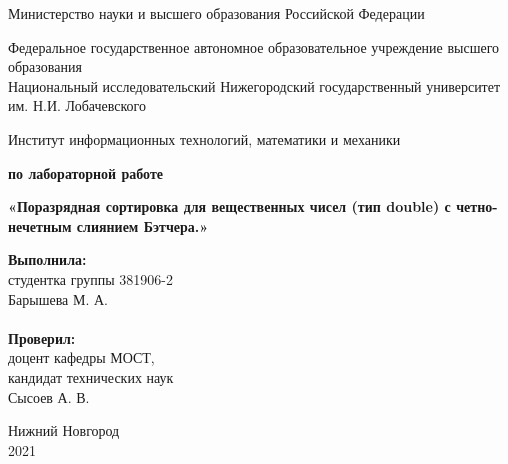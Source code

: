 \documentclass{report}
\begin{document}
\begin{titlepage}
\begin{center}
Министерство науки и высшего образования Российской Федерации
\end{center}
\begin{center}
Федеральное государственное автономное образовательное учреждение высшего образования \\
Национальный исследовательский Нижегородский государственный университет им. Н.И. Лобачевского
\end{center}
\begin{center}
Институт информационных технологий, математики и механики
\end{center}
\vspace{4em}
\begin{center}
\textbf{ по лабораторной работе} \\
\end{center}
\begin{center}
\textbf{\Large«Поразрядная сортировка для вещественных чисел (тип double) 
с четно-нечетным слиянием Бэтчера.»} \\
\end{center}
\vspace{4em}
\newbox{\lbox}
\newlength{\maxl}
\setlength{\maxl}{\wd\lbox}
\hfill\parbox{7cm}{
\hspace*{5cm}\hspace*{-5cm}\textbf{Выполнила:} \\ студентка группы 381906-2 \\ Барышева М. А.\\
\\
\hspace*{5cm}\hspace*{-5cm}\textbf{Проверил:}\\ доцент кафедры МОСТ, \\ кандидат технических наук \\ Сысоев А. В.\\
}
\vspace{\fill}
\begin{center} Нижний Новгород \\ 2021 \end{center}
\end{titlepage}
\setcounter{page}{2}
\tableofcontents
\newpage
\end{document}

